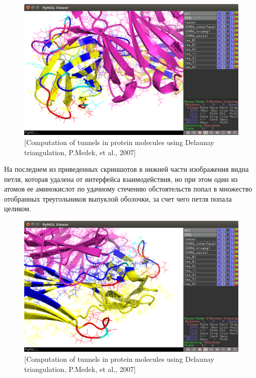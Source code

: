 \begin{figure}
\includegraphics[width=\linewidth]{loops2.png}

\caption{\small{[Computation of tunnels in protein molecules using
Delaunay triangulation, P.Medek, et al., 2007]
 }}
\label{fig:loops2}
\end{figure}



На последнем из приведенных скриншотов в нижней части изображения видна петля, которая удалена от интерфейса взаимодействия, но при этом один из атомов ее аминокислот по удачному стечению обстоятельств попал в множество отобранных треугольников выпуклой оболочки, за счет чего петля попала целиком.



\begin{figure}
\includegraphics[width=\linewidth]{loops3.png}

\caption{\small{[Computation of tunnels in protein molecules using
Delaunay triangulation, P.Medek, et al., 2007]
 }}
\label{fig:loops3}
\end{figure}



